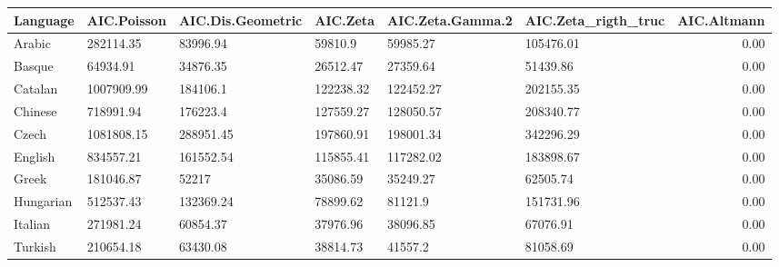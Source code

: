 \begin{table}[ht]
\centering
\begin{tabular}{llllllr}
  \hline
Language & AIC.Poisson & AIC.Dis.Geometric & AIC.Zeta & AIC.Zeta.Gamma.2 & AIC.Zeta\_rigth\_truc & AIC.Altmann \\ 
  \hline
Arabic & 282114.35 & 83996.94 & 59810.9 & 59985.27 & 105476.01 & 0.00 \\ 
  Basque & 64934.91 & 34876.35 & 26512.47 & 27359.64 & 51439.86 & 0.00 \\ 
  Catalan & 1007909.99 & 184106.1 & 122238.32 & 122452.27 & 202155.35 & 0.00 \\ 
  Chinese & 718991.94 & 176223.4 & 127559.27 & 128050.57 & 208340.77 & 0.00 \\ 
  Czech & 1081808.15 & 288951.45 & 197860.91 & 198001.34 & 342296.29 & 0.00 \\ 
  English & 834557.21 & 161552.54 & 115855.41 & 117282.02 & 183898.67 & 0.00 \\ 
  Greek & 181046.87 & 52217 & 35086.59 & 35249.27 & 62505.74 & 0.00 \\ 
  Hungarian & 512537.43 & 132369.24 & 78899.62 & 81121.9 & 151731.96 & 0.00 \\ 
  Italian & 271981.24 & 60854.37 & 37976.96 & 38096.85 & 67076.91 & 0.00 \\ 
  Turkish & 210654.18 & 63430.08 & 38814.73 & 41557.2 & 81058.69 & 0.00 \\ 
   \hline
\end{tabular}
\end{table}

